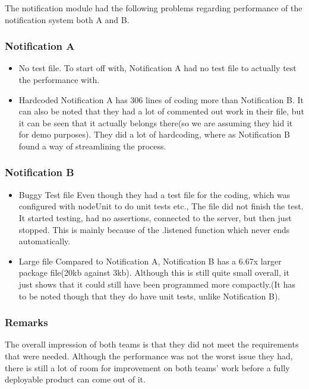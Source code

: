The notification module had the following problems regarding performance of the notification system both A and B. 
\subsubsection*{Notification A}
\begin{itemize}
    \item No test file.
    To start off with, Notification A had no test file to actually test the performance with.
    \item Hardcoded
    Notification A has 306 lines of coding more than Notification B. It can also be noted that they had a lot of commented out work in their file, but it can be seen that it actually belongs there(so we are assuming they hid it for demo purposes).
    They did a lot of hardcoding, where as Notification B found a way of streamlining the process.
\end{itemize}
\subsubsection*{Notification B}
\begin{itemize}
    \item Buggy Test file
    Even though they had a test file for the coding, which was configured with nodeUnit to do unit tests etc.,
    The file did not finish the test.  It started testing, had no assertions, connected to the server, but then just stopped. This is mainly because of the .listened function which never ends automatically.
    \item Large file
    Compared to Notification A, Notification B has a 6.67x larger package file(20kb against 3kb).  Although this is still quite small overall,  it just shows that it could still have been programmed more compactly.(It has to be noted though that they do have unit tests, unlike Notification B).
\end{itemize}
\subsubsection*{Remarks}
The overall impression of both teams is that they did not meet the requirements that were needed. Although the performance was not the worst issue they had,  there is still a lot of room for improvement on both teams' work before a fully deployable product can come out of it.
